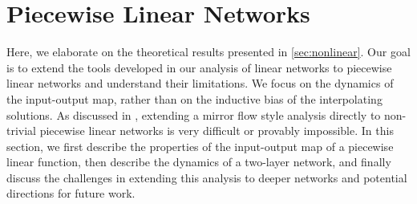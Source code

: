 \documentclass{article}
\theoremstyle{plain}
\theoremstyle{definition}
\theoremstyle{remark}
\begin{document}
\clearpage
\section{Piecewise Linear Networks}
\label{app:nonlinear}

Here, we elaborate on the theoretical results presented in \cref{sec:nonlinear}. 
%
Our goal is to extend the tools developed in our analysis of linear networks to piecewise linear networks and understand their limitations. 
%
We focus on the dynamics of the input-output map, rather than on the inductive bias of the interpolating solutions.
%
As discussed in \citet{azulay2021implicit, vardi2021implicit}, extending a mirror flow style analysis directly to non-trivial piecewise linear networks is very difficult or provably impossible. 
%
In this section, we first describe the properties of the input-output map of a piecewise linear function, then describe the dynamics of a two-layer network, and finally discuss the challenges in extending this analysis to deeper networks and potential directions for future work.
\end{document}
